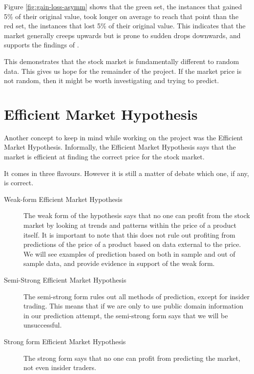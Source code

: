 \documentclass{report}
\begin{document}
Figure \ref{fig:gain-loss-asymm} shows that the green set, the instances that gained 5\% of their original value, took longer on average to reach that point than the red set, the instances that lost 5\% of their original value. This indicates that the market generally creeps upwards but is prone to sudden drops downwards, and supports the findings of \citet{karpio2007gain}.

This demonstrates that the stock market is fundamentally different to random data. This gives us hope for the remainder of the project. If the market price is not random, then it might be worth investigating and trying to predict. 

\section{Efficient Market Hypothesis}

Another concept to keep in mind while working on the project was the Efficient Market Hypothesis. Informally, the Efficient Market Hypothesis says that the market is efficient at finding the correct price for the stock market.

It comes in three flavours. However it is still a matter of debate which one, if any, is correct.

\begin{description}
  \item[Weak-form Efficient Market Hypothesis] 
  The weak form of the hypothesis says that no one can profit from the stock market by looking at trends and patterns within the price of a product itself. It is important to note that this does not rule out profiting from predictions of the price of a product based on data external to the price. We will see examples of prediction based on both in sample and out of sample data, and provide evidence in support of the weak form.
  
  \item[Semi-Strong Efficient Market Hypothesis]
  The semi-strong form rules out all methods of prediction, except for insider trading. This means that if we are only to use public domain information in our prediction attempt, the semi-strong form says that we will be unsuccessful.
  
  \item[Strong form Efficient Market Hypothesis]
  The strong form says that no one can profit from predicting the market, not even insider traders.
\end{description}
\end{document}
